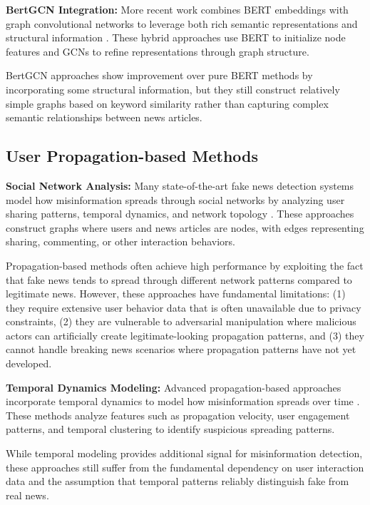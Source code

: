 \textbf{BertGCN Integration:} More recent work combines BERT embeddings with graph convolutional networks to leverage both rich semantic representations and structural information \cite{lin2021bertgcn}. These hybrid approaches use BERT to initialize node features and GCNs to refine representations through graph structure.

BertGCN approaches show improvement over pure BERT methods by incorporating some structural information, but they still construct relatively simple graphs based on keyword similarity rather than capturing complex semantic relationships between news articles.

\subsection{User Propagation-based Methods}

\textbf{Social Network Analysis:} Many state-of-the-art fake news detection systems model how misinformation spreads through social networks by analyzing user sharing patterns, temporal dynamics, and network topology \cite{shu2017fake, zhou2020survey}. These approaches construct graphs where users and news articles are nodes, with edges representing sharing, commenting, or other interaction behaviors.

Propagation-based methods often achieve high performance by exploiting the fact that fake news tends to spread through different network patterns compared to legitimate news. However, these approaches have fundamental limitations: (1) they require extensive user behavior data that is often unavailable due to privacy constraints, (2) they are vulnerable to adversarial manipulation where malicious actors can artificially create legitimate-looking propagation patterns, and (3) they cannot handle breaking news scenarios where propagation patterns have not yet developed.

\textbf{Temporal Dynamics Modeling:} Advanced propagation-based approaches incorporate temporal dynamics to model how misinformation spreads over time \cite{ma2016detecting, liu2018early}. These methods analyze features such as propagation velocity, user engagement patterns, and temporal clustering to identify suspicious spreading patterns.

While temporal modeling provides additional signal for misinformation detection, these approaches still suffer from the fundamental dependency on user interaction data and the assumption that temporal patterns reliably distinguish fake from real news.

